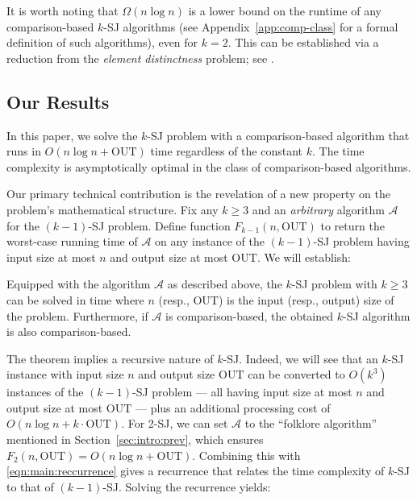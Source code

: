 \documentclass[acmsmall,review,anonymous]{acmart}
\def\vgap{\vspace{1mm}}
\def\A{\mathcal{A}}
\def\out{\mathrm{OUT}}
\begin{document}
\vgap 

It is worth noting that $\Omega(n \log n)$ is a lower bound on the runtime of any comparison-based $k$-SJ algorithms (see Appendix~\ref{app:comp-class} for a formal definition of such algorithms), even for $k = 2$. This can be established via a reduction from the {\em element distinctness} problem; see \cite{dl79}.


\subsection{Our Results} \label{sec:intro:ours} 

In this paper, we solve the $k$-SJ problem with a comparison-based algorithm that runs in $O(n \log n + \out)$ time regardless of the constant $k$. The time complexity is asymptotically optimal in the class of comparison-based algorithms.

\vgap 

Our primary technical contribution is the revelation of a new property on the problem's mathematical structure. Fix any $k \ge 3$ and an {\em arbitrary} algorithm $\A$ for the $(k-1)$-SJ problem. Define function $F_{k-1}(n, \out)$ to return the worst-case running time of $\A$ on any instance of the $(k-1)$-SJ problem having input size at most $n$ and output size at most $\out$. We will establish:

\begin{theorem} \label{thm:main-recur}
    Equipped with the algorithm $\A$ as described above, the $k$-SJ problem with $k \ge 3$ can be solved in time
    \myeqn{
        O(k^3) \cdot \big( F_{k-1}(n, \out) + n \log n + k \cdot \out \big)
        \label{eqn:main:reccurrence}
    }
    where $n$ (resp., $\out$) is the input (resp., output) size of the problem. Furthermore, if $\A$ is comparison-based, the obtained $k$-SJ algorithm is also comparison-based.
\end{theorem}

The theorem implies a recursive nature of $k$-SJ. Indeed, we will see that an $k$-SJ instance with input size $n$ and output size $\out$ can be converted to $O(k^3)$ instances of the $(k-1)$-SJ problem --- all having input size at most $n$ and output size at most $\out$ --- plus an additional processing cost of $O(n \log n + k \cdot \out)$. For 2-SJ, we can set $\A$  to the ``folklore algorithm'' mentioned in Section~\ref{sec:intro:prev}, which ensures $F_2(n, \out) = O(n \log n + \out)$. Combining this with \eqref{eqn:main:reccurrence} gives a recurrence that relates the time complexity of $k$-SJ to that of $(k-1)$-SJ. Solving the recurrence yields:
\end{document}
